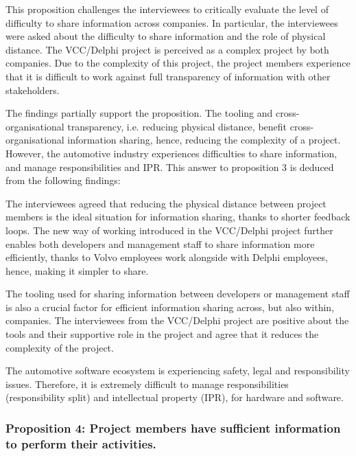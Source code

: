 This proposition challenges the interviewees to critically evaluate the level of difficulty to share information across companies. In particular, the interviewees were asked about the difficulty to share information and the role of physical distance. The VCC/Delphi project is perceived as a complex project by both companies. Due to the complexity of this project, the project members experience that it is difficult to work against full transparency of information with other stakeholders. 

The findings partially support the proposition. The tooling and cross-organisational transparency, i.e. reducing physical distance, benefit cross-organisational information sharing, hence, reducing the complexity of a project. However, the automotive industry experiences difficulties to share information, and manage responsibilities and IPR. This answer to proposition 3 is deduced from the following findings:

 The interviewees agreed that reducing the physical distance between project members is the ideal situation for information sharing, thanks to shorter feedback loops. The new way of working introduced in the VCC/Delphi project further enables both developers and management staff to share information more efficiently, thanks to Volvo employees work alongside with Delphi employees, hence, making it simpler to share. 

 The tooling used for sharing information between developers or management staff is also a crucial factor for efficient information sharing across, but also within, companies. The interviewees from the VCC/Delphi project are positive about the tools and their supportive role in the project and agree that it reduces the complexity of the project.

 The automotive software ecosystem is experiencing safety, legal and responsibility issues. Therefore, it is extremely difficult to manage responsibilities (responsibility split) and intellectual property (IPR), for hardware and software. %

\subsubsection{Proposition 4: Project members have sufficient information to perform their activities.}

